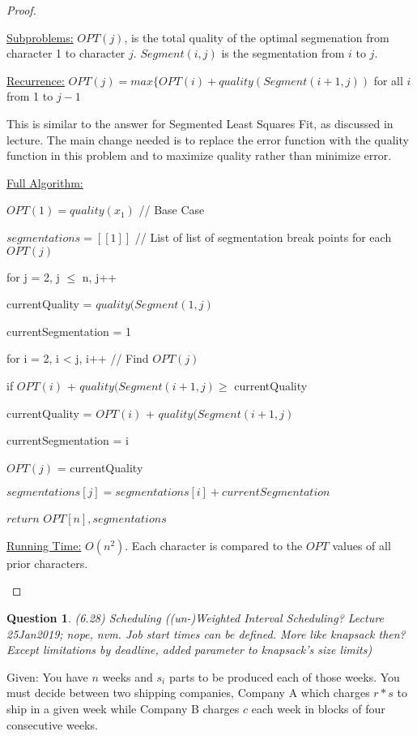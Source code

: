\documentclass[11pt, oneside]{article}   	%
\newtheorem{Question}{Question}
\begin{document}
\begin{proof}
\begin{description}

\underline{Subproblems:} $OPT(j)$, is the total quality of the optimal segmenation from character 1 to character $j$. $Segment(i, j)$ is the segmentation from $i$ to $j$.

\underline{Recurrence:} $OPT(j) = max \{OPT(i) + quality(Segment(i+1, j))$ for all $i$ from 1 to $j-1$

This is similar to the answer for Segmented Least Squares Fit, as discussed in lecture. The main change needed is to replace the error function with the quality function in this problem and to maximize quality rather than minimize error.

\underline{Full Algorithm:}

$OPT(1) = quality(x_1)$    \quad // Base Case

$segmentations = [[1]]$	 \quad // List of list of segmentation break points for each $OPT(j)$

for j = 2, j $\leq$ n, j++

	\quad currentQuality = $quality(Segment(1, j)$

	\quad currentSegmentation = 1

	\quad for i = 2, i < j, i++ \quad // Find $OPT(j)$

	\quad \quad if $OPT(i)$ + $quality(Segment(i+1, j) \geq$  currentQuality

	\quad \quad \quad currentQuality = $OPT(i)$ + $quality(Segment(i+1, j)$

	\quad \quad \quad currentSegmentation = i

	\quad $OPT(j)$ = currentQuality

	\quad $segmentations[j] = segmentations[i] + currentSegmentation$

$return$ $OPT[n], segmentations$

\underline{Running Time:} $O(n^2)$. Each character is compared to the $OPT$ values of all prior characters.

\end{description}
\end{proof}

\newpage

\begin{Question} (6.28) Scheduling ((un-)Weighted Interval Scheduling? Lecture 25Jan2019; nope, nvm. Job start times can be defined. More like knapsack then? Except limitations by deadline, added parameter to knapsack's size limits)
\end{Question}
\noindent Given: You have $n$ weeks and $s_i$ parts to be produced each of those weeks. You must decide between two shipping companies, Company A which charges $r * s$ to ship in a given week while Company B charges $c$ each week in blocks of four consecutive weeks.\\
\end{document}
